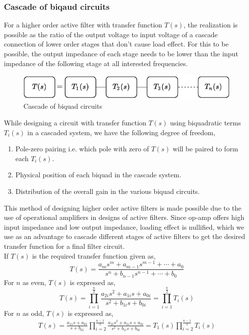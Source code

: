 \documentclass{lab_sheet}
\begin{document}
    \subsubsection{Cascade of biqaud circuits}
    For a higher order active filter with transfer function $T(s)$, the realization is possible as the ratio of the output voltage to input voltage of a cascade connection of lower order stages that don't cause load effect. For this to be possible, the output impedance of each stage needs to be lower than the input impedance of the following stage at all interested frequencies.
    \begin{figure}[H]
        \centering
        \includegraphics[width=\linewidth]{../Figures/cascade_block}
        \caption{Cascade of biquad circuits}
        \label{fig:cascade_block}
    \end{figure}
    While designing a circuit with transfer function $T(s)$ using biquadratic terms $T_i(s)$ in a cascaded system, we have the following degree of freedom,
    \begin{enumerate}
        \item Pole-zero pairing i.e. which pole with zero of $T(s)$ will be paired to form each $T_i(s)$.
        \item Physical position of each biquad in the cascade system.
        \item Distribution of the overall gain in the various biquad circuits.
    \end{enumerate}
    This method of designing higher order active filters is made possible due to the use of operational amplifiers in designs of active filters. Since op-amp offers high input impedance and low output impedance, loading effect is nullified, which we use as an advantage to cascade different stages of active filters to get the desired transfer function for a final filter circuit.\\
    If $T(s)$ is the required transfer function given as,
    \begin{equation*}
        T(s)=\frac{a_ms^m+a_{m-1}s^{m-1}+\cdots+a_0}{s^n+b_{n-1}s^{n-1}+\cdots+b_0}
    \end{equation*}
    For $n$ as even, $T(s)$ is expressed as,
    \begin{equation*} 
            T(s)=\prod_{i=1}^{\frac{n}{2}}\frac{a_{2i}s^2+a_{1i}s+a_{0i}}{s^2+b_{1i}s+b_{0i}}=\prod_{i=1}^{\frac{n}{2}}T_i(s)
    \end{equation*}
    For $n$ as odd, $T(s)$ is expressed as,
    \begin{equation*} 
      \begin{aligned}
          T(s)=\frac{a_{11}s+a_{01}}{s+b_{01}}\prod_{i=2}^{\frac{n-1}{2}}\frac{a_{2i}s^2+a_{1i}s+a_{0i}}{s^2+b_{1i}s+b_{0i}}=T_1(s)\prod_{i=2}^{\frac{n-1}{2}}T_i(s)
      \end{aligned}
\end{equation*}
\end{document}
